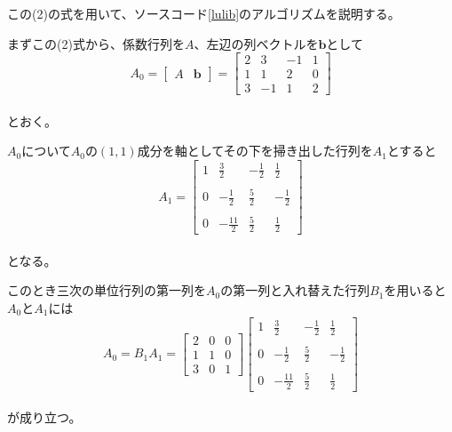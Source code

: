 \documentclass[a4paper,11pt]{jsarticle}
\begin{document}
この(2)の式を用いて、ソースコード\ref{lulib}のアルゴリズムを説明する。

まずこの(2)式から、係数行列を$A$、左辺の列ベクトルを$\textbf{b}$として
\begin{equation}
    A_0 = 
    \begin{bmatrix}
        A & \textbf{b}
    \end{bmatrix}
    =
    \begin{bmatrix}
        2 & 3 & -1 & 1\\
        1 & 1 & 2 & 0\\
        3 & -1 & 1 & 2
    \end{bmatrix}
\end{equation}
\\
とおく。

$A_0$について$A_0$の$(1,1)$成分を軸としてその下を掃き出した行列を$A_1$とすると
\begin{equation}
    A_1 = 
    \begin{bmatrix}
        1 & \displaystyle \frac{3}{2} & 
        \displaystyle -\frac{1}{2} & \displaystyle \frac{1}{2} \\ \\
        0 & \displaystyle -\frac{1}{2} & 
        \displaystyle \frac{5}{2} & \displaystyle -\frac{1}{2} \\ \\
        0 & \displaystyle -\frac{11}{2} & 
        \displaystyle \frac{5}{2} & \displaystyle \frac{1}{2}
    \end{bmatrix}
\end{equation}
\\
となる。

このとき三次の単位行列の第一列を$A_0$の第一列と入れ替えた行列$B_1$を用いると$A_0$と$A_1$には
\begin{equation}
    A_0 = B_1 A_1
    =
    \begin{bmatrix}
        2 & 0 & 0\\
        1 & 1 & 0\\
        3 & 0 & 1
    \end{bmatrix}
    \begin{bmatrix}
        1 & \displaystyle \frac{3}{2} & 
        \displaystyle -\frac{1}{2} & \displaystyle \frac{1}{2} \\ \\
        0 & \displaystyle -\frac{1}{2} & 
        \displaystyle \frac{5}{2} & \displaystyle -\frac{1}{2} \\ \\
        0 & \displaystyle -\frac{11}{2} & 
        \displaystyle \frac{5}{2} & \displaystyle \frac{1}{2}
    \end{bmatrix}
\end{equation}
\\
が成り立つ。
\end{document}
